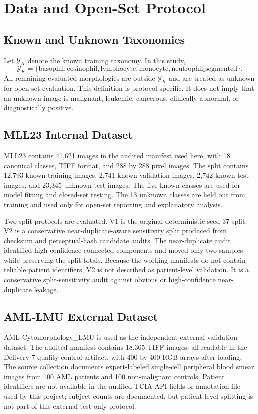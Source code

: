 \section{Data and Open-Set Protocol}

\subsection{Known and Unknown Taxonomies}

Let $\mathcal{Y}_K$ denote the known training taxonomy. In this study,
\[
\mathcal{Y}_K=\{\text{basophil},\text{eosinophil},\text{lymphocyte},\text{monocyte},\text{neutrophil\_segmented}\}.
\]
All remaining evaluated morphologies are outside $\mathcal{Y}_K$ and are treated as unknown for open-set evaluation. This definition is protocol-specific. It does not imply that an unknown image is malignant, leukemic, cancerous, clinically abnormal, or diagnostically positive.

\subsection{MLL23 Internal Dataset}

MLL23 contains 41,621 images in the audited manifest used here, with 18 canonical classes, TIFF format, and 288 by 288 pixel images. The split contains 12,793 known-training images, 2,741 known-validation images, 2,742 known-test images, and 23,345 unknown-test images. The five known classes are used for model fitting and closed-set testing. The 13 unknown classes are held out from training and used only for open-set reporting and explanatory analysis.

Two split protocols are evaluated. V1 is the original deterministic seed-37 split. V2 is a conservative near-duplicate-aware sensitivity split produced from checksum and perceptual-hash candidate audits. The near-duplicate audit identified high-confidence connected components and moved only two samples while preserving the split totals. Because the working manifests do not contain reliable patient identifiers, V2 is not described as patient-level validation. It is a conservative split-sensitivity audit against obvious or high-confidence near-duplicate leakage.

\subsection{AML-LMU External Dataset}

AML-Cytomorphology\_LMU is used as the independent external validation dataset. The audited manifest contains 18,365 TIFF images, all readable in the Delivery 7 quality-control artifact, with 400 by 400 RGB arrays after loading. The source collection documents expert-labeled single-cell peripheral blood smear images from 100 AML patients and 100 non-malignant controls. Patient identifiers are not available in the audited TCIA API fields or annotation file used by this project; subject counts are documented, but patient-level splitting is not part of this external test-only protocol.

